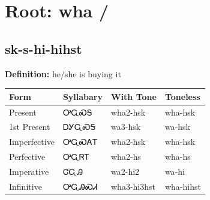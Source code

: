 \documentclass{article}%
\begin{document}
%
\normalsize%
\section*{Root: wha / }%
\subsection*{sk-s-hi-hihst}%
\textbf{Definition: }%
he/she is buying it%
\\[0.5em]%
\begin{tabular}{|l|l|l|l|}%
\hline%
\textbf{Form}&\textbf{Syllabary}&\textbf{With Tone}&\textbf{Toneless}\\%
\hline%
Present&ᎤᏩᏍᎦ&wha2{-}hsk&wha{-}hsk\\%
1st Present&ᎠᎩᏩᏍᎦ&wa3{-}hsk&wa{-}hsk\\%
Imperfective&ᎤᏩᏍᎪᎢ&wha2{-}hsk&wha{-}hsk\\%
Perfective&ᎤᏩᏒᎢ&wha2{-}hs&wha{-}hs\\%
Imperative&ᏣᏩᎯ&wa2{-}hi2&wa{-}hi\\%
Infinitive&ᎤᏩᎯᏍᏗ&wha3{-}hi3hst&wha{-}hihst\\%
\hline%
\end{tabular}%
\\[1em]%
\end{document}
